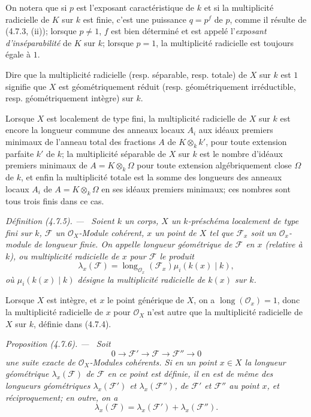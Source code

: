 \documentclass[10pt,oneside]{book}
\newcommand{\oldpage}[2][]{%
  \setcounter{footnote}{0}%
  \marginpar{\scriptsize\textbf{#1}~|~#2}\ignorespaces}
\newenvironment{definition}[1][]{%
  \par\medskip\noindent\itshape Définition (#1). ---\ }{\par}
\newenvironment{proposition}[1][]{%
  \par\medskip\noindent\itshape Proposition (#1). ---\ }{\par}
\begin{document}
On notera que si $p$ est l'exposant caractéristique de $k$ et si la
multiplicité radicielle de $K$ sur $k$ est finie, c'est une puissance $q=p^f$
de $p$, comme il résulte de (4.7.3, (ii)); lorsque $p\ne1$, $f$ est bien
déterminé et est appelé l'\emph{exposant d'inséparabilité} de $K$ sur $k$;
lorsque $p=1$, la multiplicité radicielle est toujours égale à $1$.

Dire que la multiplicité radicielle (resp. séparable, resp. totale) de $X$ sur
$k$ est $1$ signifie que $X$ est géométriquement réduit (resp.
géométriquement irréductible, resp. géométriquement intègre) sur $k$.

Lorsque $X$ est localement de type fini, la multiplicité radicielle de $X$ sur
$k$ est encore la longueur commune des anneaux locaux $A_i$ aux idéaux
premiers minimaux de l'anneau total des fractions $A$ de $K\otimes_k k'$,
pour toute extension parfaite $k'$ de $k$; la multiplicité séparable de $X$
sur $k$ est le nombre d'idéaux premiers minimaux de $A=K\otimes_k\Omega$ pour
toute extension algébriquement close $\Omega$ de $k$, et enfin la multiplicité
totale est la somme des longueurs des anneaux locaux $A_i$ de
$A=K\otimes_k\Omega$ en ses idéaux premiers minimaux; ces nombres sont tous
trois finis dans ce cas.

\begin{definition}[4.7.5]
\label{IV.2.4.7.5-fr}
Soient $k$ un corps, $X$ un $k$-préschéma localement de type fini sur $k$,
$\mathscr F$ un $\mathcal O_X$-Module cohérent, $x$ un point de $X$ tel que
$\mathscr F_x$ soit un $\mathcal O_x$-module de longueur finie. On appelle
\emph{longueur géométrique} de $\mathscr F$ en $x$ (relative à $k$), ou
\emph{multiplicité radicielle de $x$ pour $\mathscr F$} le produit
\[
\lambda_x(\mathscr F)
=\operatorname{long}_{\mathcal O_x}(\mathscr F_x)\mu_i(k(x)\mid k),
\]
où $\mu_i(k(x)\mid k)$ désigne la multiplicité radicielle de $k(x)$ sur $k$.
\end{definition}

Lorsque $X$ est intègre, et $x$ le point générique de $X$, on a
$\operatorname{long}(\mathcal O_x)=1$, donc la multiplicité radicielle de $x$
pour $\mathcal O_X$ n'est autre que la multiplicité radicielle de $X$ sur $k$,
définie dans (4.7.4).

\oldpage[IV-2]{78}

\begin{proposition}[4.7.6]
\label{IV.2.4.7.6-fr}
Soit
\[
0\longrightarrow\mathscr F'\longrightarrow\mathscr F
\longrightarrow\mathscr F''\longrightarrow0
\]
une suite exacte de $\mathcal O_X$-Modules cohérents. Si en un point $x\in X$
la longueur géométrique $\lambda_x(\mathscr F)$ de $\mathscr F$ en ce point
est définie, il en est de même des longueurs géométriques
$\lambda_x(\mathscr F')$ et $\lambda_x(\mathscr F'')$, de $\mathscr F'$ et
$\mathscr F''$ au point $x$, et réciproquement; en outre, on a
\begin{equation}
\lambda_x(\mathscr F)=\lambda_x(\mathscr F')+\lambda_x(\mathscr F'').
\tag{4.7.6.1}
\label{IV.2.4.7.6.1-fr}
\end{equation}
\end{proposition}
\end{document}
